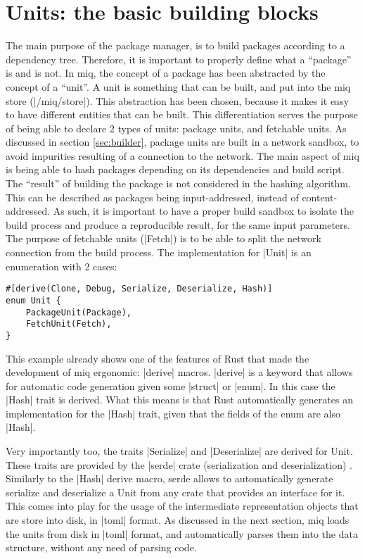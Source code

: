 \section{Units: the basic building blocks}
\label{sec:unit}

The main purpose of the package manager, is to build
packages according to a dependency tree. Therefore, it is
important to properly define what a ``package'' is and is
not. In miq, the concept of a package has been abstracted by
the concept of a ``unit''. A unit is something that can be
built, and put into the miq store (|/miq/store|). This
abstraction has been chosen, because it makes it easy to
have different entities that can be built. This
differentiation serves the purpose of being able to declare
2 types of units: package units, and fetchable units.
As discussed in section \ref{sec:builder}, package units are
built in a network sandbox, to avoid impurities resulting of
a connection to the network. The main aspect of miq is being
able to hash packages depending on its dependencies and
build script. The ``result'' of building the package is not
considered in the hashing algorithm. This can be described
as packages being input-addressed, instead of
content-addressed. As such, it is important to have a proper
build sandbox to isolate the build process and produce a
reproducible result, for the same input parameters. The
purpose of fetchable units (|Fetch|) is to be able to split
the network connection from the build process. The
implementation for |Unit| is an enumeration with 2 cases:

\begin{verbatim}
#[derive(Clone, Debug, Serialize, Deserialize, Hash)]
enum Unit {
    PackageUnit(Package),
    FetchUnit(Fetch),
}
\end{verbatim}

This example already shows one of the features of Rust that
made the development of miq ergonomic: |derive| macros.
|derive| is a keyword that allows for automatic code
generation given some |struct| or |enum|. In this case the
|Hash| trait is derived. What this means is that Rust
automatically generates an implementation for the |Hash|
trait, given that the fields of the enum are also |Hash|.

Very importantly too, the traits |Serialize| and
|Deserialize| are derived for Unit. These traits are
provided by the |serde| crate (serialization and
deserialization) \cite{Serde} . Similarly to the |Hash|
derive macro, serde allows to automatically generate
serialize and deserialize a Unit from any crate that
provides an interface for it. This comes into play for the
usage of the intermediate representation objects that are
store into disk, in |toml| format. As discussed in the next
section, miq loads the units from disk in |toml| format, and
automatically parses them into the data structure, without
any need of parsing code.

